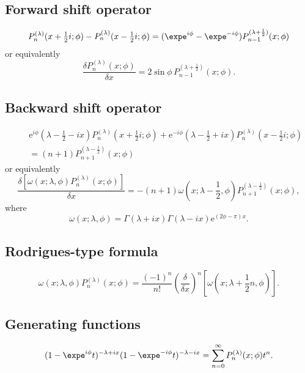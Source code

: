 \documentclass[envcountchap,graybox]{svmono}
\newcommand{\e}{\textrm{e}}
\renewcommand{\Gamma}{\varGamma}
\begin{document}
\subsection*{Forward shift operator}
\begin{equation}
\label{shift1MPI}
P_n^{(\lambda)}(x+\textstyle\frac{1}{2}i;\phi)-
P_n^{(\lambda)}(x-\textstyle\frac{1}{2}i;\phi)=(\expe^{i\phi}-\expe^{-i\phi})
P_{n-1}^{(\lambda+\frac{1}{2})}(x;\phi)
\end{equation}
or equivalently
\begin{equation}
\label{shift1MPII}
\frac{\delta P_n^{(\lambda)}(x;\phi)}{\delta x}
=2\sin\phi\,P_{n-1}^{(\lambda+\frac{1}{2})}(x;\phi).
\end{equation}

\subsection*{Backward shift operator}
\begin{eqnarray}
\label{shift2MPI}
& &\e^{i\phi}(\lambda-\textstyle\frac{1}{2}-ix)
P_n^{(\lambda)}(x+\textstyle\frac{1}{2}i;\phi)+
\e^{-i\phi}(\lambda-\textstyle\frac{1}{2}+ix)
P_n^{(\lambda)}(x-\textstyle\frac{1}{2}i;\phi)\nonumber\\
& &{}=(n+1)P_{n+1}^{(\lambda-\frac{1}{2})}(x;\phi)
\end{eqnarray}
or equivalently
\begin{equation}
\label{shift2MPII}
\frac{\delta\left[\omega(x;\lambda,\phi)P_n^{(\lambda)}(x;\phi)\right]}{\delta x}=
-(n+1)\omega(x;\lambda-\textstyle\frac{1}{2},\phi)
P_{n+1}^{(\lambda-\frac{1}{2})}(x;\phi),
\end{equation}
where
$$\omega(x;\lambda,\phi)=\Gamma(\lambda+ix)\Gamma(\lambda-ix)\e^{(2\phi-\pi)x}.$$

\subsection*{Rodrigues-type formula}
\begin{equation}
\label{RodMP}
\omega(x;\lambda,\phi)P_n^{(\lambda)}(x;\phi)=\frac{(-1)^n}{n!}
\left(\frac{\delta}{\delta x}\right)^n\left[\omega(x;\lambda+\textstyle\frac{1}{2}n,\phi)\right].
\end{equation}

\newpage

\subsection*{Generating functions}
\begin{equation}
\label{GenMP1}
(1-\expe^{i\phi}t)^{-\lambda+ix}(1-\expe^{-i\phi}t)^{-\lambda-ix}=
\sum_{n=0}^{\infty}P_n^{(\lambda)}(x;\phi)t^n.
\end{equation}
\end{document}
